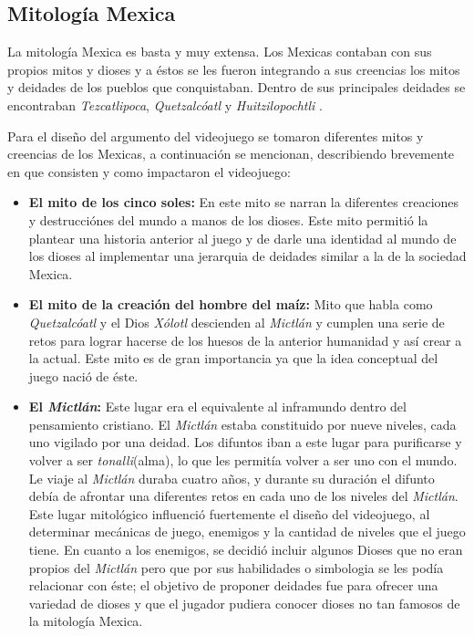 	 \subsection{Mitología Mexica} 
	 La mitología Mexica es basta y muy extensa. Los Mexicas contaban con sus propios 
	 mitos y dioses y a éstos se les fueron integrando a sus creencias los mitos y
	  deidades de los pueblos que conquistaban. Dentro de sus principales deidades 
	  se encontraban \textit{Tezcatlipoca}, \textit{Quetzalcóatl} y 
	  \textit{Huitzilopochtli} \cite{RefMexicasSol}.
	 \\
	 \par
	 Para el diseño del argumento del videojuego se tomaron diferentes mitos y creencias
	 de los Mexicas, a continuación se mencionan, describiendo brevemente en que
	 consisten y como impactaron el videojuego:
	 \begin{itemize}
		\item \textbf{El mito de los cinco soles:} En este mito se narran la diferentes 
		creaciones y destrucciónes del mundo a manos de los dioses\cite{RefMexicasMito}. 
		Este mito permitió la plantear una historia anterior al juego y de darle una 
		identidad al mundo de los dioses al implementar una jerarquia de deidades 
		similar a la de la sociedad Mexica.
		\item \textbf{El mito de la creación del hombre del maíz:} Mito que habla como 
		\textit{Quetzalcóatl} y el Dios \textit{Xólotl} descienden al \textit{Mictlán}
		 y cumplen una serie de retos para lograr hacerse de los huesos de la anterior 
		 humanidad y así crear a la actual\cite{RefMexicasMito}. Este mito es de gran 
		 importancia ya que la idea conceptual del juego nació de éste.
		\item \textbf{El \textit{Mictlán}:} Este lugar era el equivalente al inframundo
		dentro del pensamiento cristiano. El \textit{Mictlán} estaba constituido por 
		nueve niveles, cada uno vigilado por una deidad. Los difuntos iban a este lugar 
		para purificarse y volver a ser \textit{tonalli}(alma), lo que les permitía 
		volver a ser uno con el mundo. Le viaje al \textit{Mictlán} duraba cuatro años, 
		y durante su duración el difunto debía de afrontar una diferentes retos en 
		cada uno de los niveles del \textit{Mictlán}\cite{RefMexicasSol}. Este lugar 
		mitológico influenció fuertemente el diseño del videojuego, al determinar 
		mecánicas de juego, enemigos y la cantidad de niveles que el juego tiene. En 
		cuanto a los enemigos, se decidió incluir algunos Dioses que no eran propios 
		del \textit{Mictlán} pero que por sus habilidades o simbologia se les podía 
		relacionar con éste; el objetivo de proponer deidades fue para ofrecer una 
		variedad de dioses y que el jugador pudiera conocer dioses no tan famosos de la 
		mitología Mexica.    
	 \end{itemize}	 
	 

